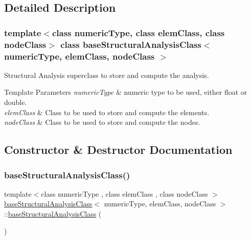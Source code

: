 \subsection{Detailed Description}
\subsubsection*{template$<$class numeric\+Type, class elem\+Class, class node\+Class$>$\newline
class base\+Structural\+Analysis\+Class$<$ numeric\+Type, elem\+Class, node\+Class $>$}

Structural Analysis superclass to store and compute the analysis. 
\begin{DoxyTemplParams}{Template Parameters}
{\em numeric\+Type} & numeric type to be used, either float or double. \\
\hline
{\em elem\+Class} & Class to be used to store and compute the elements. \\
\hline
{\em node\+Class} & Class to be used to store and compute the nodes. \\
\hline
\end{DoxyTemplParams}


\subsection{Constructor \& Destructor Documentation}
\mbox{\label{classbase_structural_analysis_class_a743a6d6c9b29ce5c7e299ed246691b9a}} 
\subsubsection{\texorpdfstring{base\+Structural\+Analysis\+Class()}{baseStructuralAnalysisClass()}\hspace{0.1cm}{\footnotesize\ttfamily [1/2]}}
{\footnotesize\ttfamily template$<$class numeric\+Type , class elem\+Class , class node\+Class $>$ \\
\mbox{\hyperlink{classbase_structural_analysis_class}{base\+Structural\+Analysis\+Class}}$<$ numeric\+Type, elem\+Class, node\+Class $>$\+::\mbox{\hyperlink{classbase_structural_analysis_class}{base\+Structural\+Analysis\+Class}} (\begin{DoxyParamCaption}{ }\end{DoxyParamCaption})}

